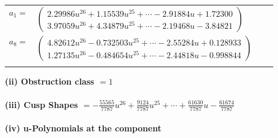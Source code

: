 \documentclass[1p]{elsarticle_modified}
\theoremstyle{definition}
\begin{document}
\begin{tabular}{m{7pt} m{180pt} m{7pt} m{180pt} }
\flushright $a_{1}=$&$\begin{pmatrix}2.29986 u^{26}+1.15539 u^{25}+\cdots-2.91884 u+1.72300\\3.97059 u^{26}+4.34879 u^{25}+\cdots-2.19468 u-3.84821\end{pmatrix}$ \\
\flushright $a_{8}=$&$\begin{pmatrix}4.82612 u^{26}-0.732503 u^{25}+\cdots-2.55284 u+0.128933\\1.27135 u^{26}-0.484654 u^{25}+\cdots-2.44818 u-0.998844\end{pmatrix}$\\&\end{tabular}
\flushleft \textbf{(ii) Obstruction class $= 1$}\\~\\
\flushleft \textbf{(iii) Cusp Shapes $= -\frac{55565}{7787} u^{26}+\frac{9124}{7787} u^{25}+\cdots+\frac{61630}{7787} u-\frac{61674}{7787}$}\\~\\
\newpage\renewcommand{\arraystretch}{1}
\flushleft \textbf{(iv) u-Polynomials at the component}\newline \\
\end{document}
